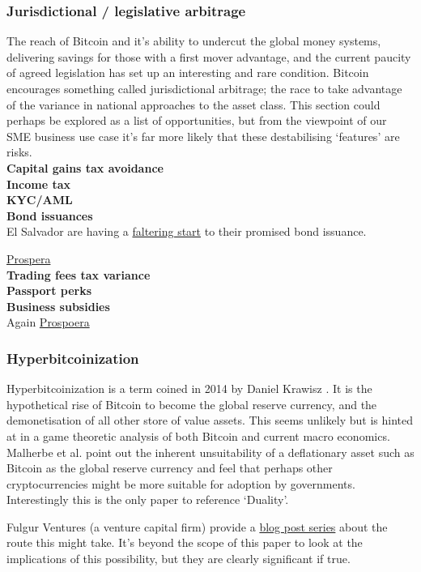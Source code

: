 \subsubsection{Jurisdictional / legislative arbitrage}
The reach of Bitcoin and it's ability to undercut the global money systems, delivering savings for those with a first mover advantage, and the current paucity of agreed legislation has set up an interesting and rare condition. Bitcoin encourages something called jurisdictional arbitrage; the race to take advantage of the variance in national approaches to the asset class. This section could perhaps be explored as a list of opportunities, but from the viewpoint of our SME business use case it's far more likely that these destabilising `features' are risks.\\
\textbf{Capital gains tax avoidance}\\
\textbf{Income tax}\\
\textbf{KYC/AML}\\
\textbf{Bond issuances}\\
El Salvador are having a \href{https://www.ft.com/content/4fa63c8c-51f5-4512-b522-76dd75e62916}{faltering start} to their promised bond issuance.\par
\href{https://prospera.hn/news/press-releases/pr\%C3\%B3spera-announces-bitcoin-bond-authority-in-the-first-crypto-friendly-jurisdiction-that-is-fully-aml-kyc-compliant}{Prospera}\\
\textbf{Trading fees tax variance}\\
\textbf{Passport perks}\\
\textbf{Business subsidies}\\
Again \href{https://davisclute.medium.com/visiting-a-startup-city-in-honduras-73d9c026ee6d}{Prospoera}
\subsubsection{Hyperbitcoinization}
Hyperbitcoinization is a term coined in 2014 by Daniel Krawisz \cite{krawisz2014hyperbitcoinization}. It is the hypothetical rise of Bitcoin to become the global reserve currency, and the demonetisation of all other store of value assets. This seems unlikely but is hinted at in a game theoretic analysis of both Bitcoin and current macro economics. Malherbe et al. point out the inherent unsuitability of a deflationary asset such as Bitcoin as the global reserve currency \cite{malherbe2019cryptocurrencies} and feel that perhaps other cryptocurrencies might be more suitable for adoption by governments. Interestingly this is the only paper to reference `Duality'.\par  Fulgur Ventures (a venture capital firm) provide a \href{https://medium.com/@fulgur.ventures/the-roads-to-hyperbitcoinization-part-1-27dc84d0e5e5}{blog post series} about the route this might take. It's beyond the scope of this paper to look at the implications of this possibility, but they are clearly significant if true. 

